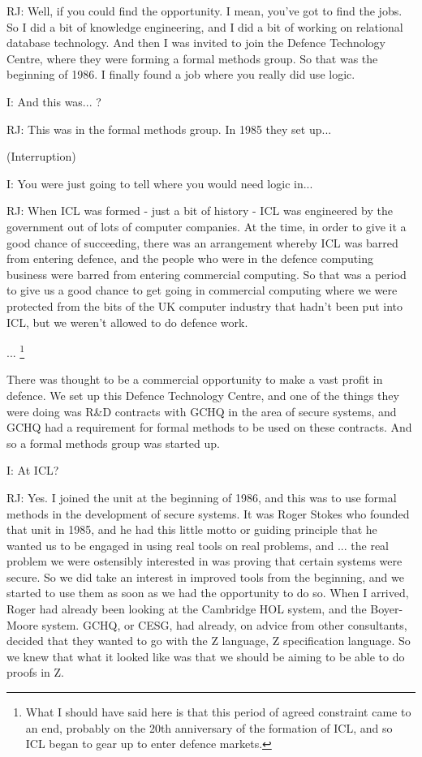 \documentclass[10pt,titlepage]{book}
\begin{document}
RJ: Well, if you could find the opportunity. I mean, you've got to find the jobs. So I did a bit of knowledge engineering, and I did a bit of working on relational database technology. And then I was invited to join the Defence Technology Centre, where they were forming a formal methods group. So that was the beginning of 1986. I finally found a job where you really did use logic.

I: And this was... ?

RJ: This was in the formal methods group. In 1985 they set up...

(Interruption)

I: You were just going to tell where you would need logic in...

RJ: 
When ICL was formed - just a bit of history - ICL was engineered by the government out of lots of computer companies.
At the time, in order to give it a good chance of succeeding, there was an arrangement whereby ICL was barred from entering defence, and the people who were in the defence computing business were barred from entering commercial computing.
So that was a period to give us a good chance to get going in commercial computing where we were protected from the bits of the UK computer industry that hadn't been put into ICL, but we weren't allowed to do defence work.

...%
\footnote{
What I should have said here is that this period of agreed constraint came to an end, probably on the 20th anniversary of the formation of ICL, and so ICL began to gear up to enter defence markets.
}

There was thought to be a commercial opportunity to make a vast profit in defence.
We set up this Defence Technology Centre, and one of the things they were doing was R\&D contracts with GCHQ in the area of secure systems, and GCHQ had a requirement for formal methods to be used on these contracts.
And so a formal methods group was started up.

I: At ICL?

RJ: Yes.
I joined the unit at the beginning of 1986, and this was to use formal methods in the development of secure systems.
It was Roger Stokes who founded that unit in 1985, and he had this little motto or guiding principle that he wanted us to be engaged in using real tools on real problems, and ... the real problem we were ostensibly interested in was proving that certain systems were secure.
So we did take an interest in improved tools from the beginning, and we started to use them as soon as we had the opportunity to do so.
When I arrived, Roger had already been looking at the Cambridge HOL system, and the Boyer-Moore system.
GCHQ, or CESG, had already, on advice from other consultants, decided that they wanted to go with the Z language, Z specification language.
So we knew that what it looked like was that we should be aiming to be able to do proofs in Z.
\end{document}
